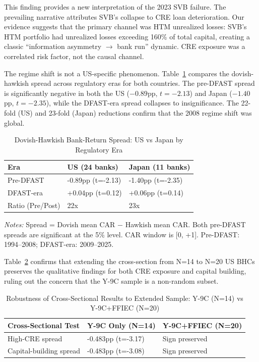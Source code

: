 \documentclass[12pt,a4paper]{article}
\begin{document}
This finding provides a new interpretation of the 2023 SVB failure. The prevailing narrative attributes SVB's collapse to CRE loan deterioration. Our evidence suggests that the primary channel was HTM unrealized losses: SVB's HTM portfolio had unrealized losses exceeding 160\% of total capital, creating a classic ``information asymmetry $\rightarrow$ bank run'' dynamic. CRE exposure was a correlated risk factor, not the causal channel.

The regime shift is not a US-specific phenomenon. Table~\ref{tab:regime_shift} compares the dovish-hawkish spread across regulatory eras for both countries. The pre-DFAST spread is significantly negative in both the US ($-0.89$pp, $t = -2.13$) and Japan ($-1.40$pp, $t = -2.35$), while the DFAST-era spread collapses to insignificance. The 22-fold (US) and 23-fold (Japan) reductions confirm that the 2008 regime shift was global.

\begin{table}[H]
\centering
\caption{Dovish-Hawkish Bank-Return Spread: US vs Japan by Regulatory Era}
\label{tab:regime_shift}
\small
\begin{tabular}{lll}
\toprule
Era & US (24 banks) & Japan (11 banks) \\
\midrule
Pre-DFAST & -0.89pp (t=-2.13) & -1.40pp (t=-2.35) \\
DFAST-era & +0.04pp (t=0.12) & +0.06pp (t=0.14) \\
Ratio (Pre/Post) & 22x  & 23x  \\
\bottomrule
\end{tabular}
\end{table}
\noindent\textit{Notes:} Spread = Dovish mean CAR $-$ Hawkish mean CAR. Both pre-DFAST spreads are significant at the 5\% level. CAR window is [0, +1]. Pre-DFAST: 1994--2008; DFAST-era: 2009--2025.

Table~\ref{tab:ffiec} confirms that extending the cross-section from N=14 to N=20 US BHCs preserves the qualitative findings for both CRE exposure and capital building, ruling out the concern that the Y-9C sample is a non-random subset.

\begin{table}[H]
\centering
\caption{Robustness of Cross-Sectional Results to Extended Sample: Y-9C (N=14) vs Y-9C+FFIEC (N=20)}
\label{tab:ffiec}
\small
\begin{tabular}{lll}
\toprule
Cross-Sectional Test & Y-9C Only (N=14) & Y-9C+FFIEC (N=20) \\
\midrule
High-CRE spread & -0.483pp (t=-3.17) & Sign preserved \\
Capital-building spread & -0.483pp (t=-3.08) & Sign preserved \\
\bottomrule
\end{tabular}
\end{table}
\end{document}
